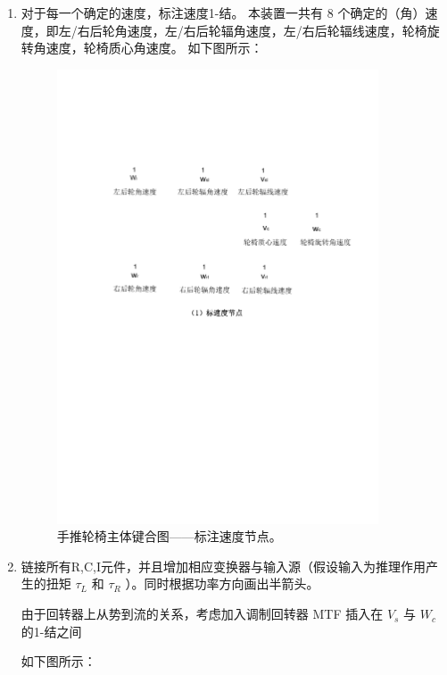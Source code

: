 	\begin{enumerate}
		
		\item 对于每一个确定的速度，标注速度1-结。
		本装置一共有 8 个确定的（角）速度，即左/右后轮角速度，左/右后轮辐角速度，左/右后轮辐线速度，轮椅旋转角速度，轮椅质心角速度。
		如下图所示：
		\begin{figure}[!h]
			\centering
			\includegraphics[width=0.9\textwidth]{fig/3_1_bond.pdf}
			\caption{手推轮椅主体键合图——标注速度节点。}\label{fig:3_1_bond}
		\end{figure}
			
		\item 链接所有R,C,I元件，并且增加相应变换器与输入源（假设输入为推理作用产生的扭矩 $ \tau_L $ 和 $ \tau_R $ ）。同时根据功率方向画出半箭头。
		
		由于回转器上从势到流的关系，考虑加入调制回转器 MTF 插入在 $ V_s $ 与 $ W_c $ 的1-结之间
		
		如下图所示：
		

\end{enumerate}
